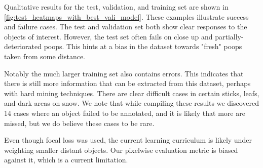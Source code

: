 \documentclass[10pt,twocolumn,letterpaper]{article}
\begin{document}
Qualitative results for the test, validation, and training set are shown in
\cref{fig:test_heatmaps_with_best_vali_model}. These examples illustrate
success and failure cases. The test and validation set both show clear
responses to the objects of interest. However, the test set often fails on
close up and partially-deteriorated poops. This hints at a bias in the dataset
towards "fresh" poops taken from some distance.

Notably the much larger training set also contains errors. This indicates that
there is still more information that can be extracted from this dataset,
perhaps with hard mining techniques. There are clear difficult cases in certain
sticks, leafs, and dark areas on snow. We note that while compiling these
results we discovered 14 cases where an object failed to be annotated, and it
is likely that more are missed, but we do believe these cases to be rare.





Even though focal loss was used, the current learning curriculum is likely
under weighting smaller distant objects. Our pixelwise evaluation metric is
biased against it, which is a current limitation.
\end{document}

